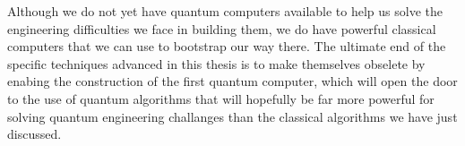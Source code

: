 \documentclass[12pt]{amsbook}
\theoremstyle{plain}
\theoremstyle{definition}
\theoremstyle{remark}
\begin{document}
Although we do not yet have quantum computers available to help us solve the engineering difficulties we face in building them, we do have powerful classical computers that we can use to bootstrap our way there.  The ultimate end of the specific techniques advanced in this thesis is to make themselves obselete by enabing the construction of the first quantum computer, which will open the door to the use of quantum algorithms that will hopefully be far more powerful for solving quantum engineering challanges than the classical algorithms we have just discussed.


\end{document}
